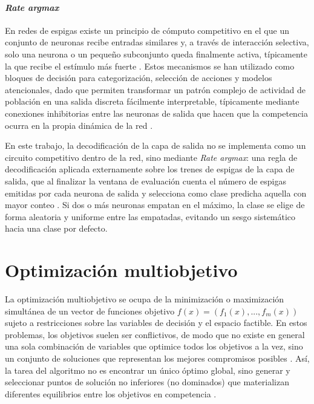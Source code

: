 \paragraph{\textit{Rate argmax}}
En redes de espigas existe un principio de cómputo competitivo en el que un conjunto de neuronas recibe entradas similares y, a través de interacción selectiva, solo una neurona o un pequeño subconjunto queda finalmente activa, típicamente la que recibe el estímulo más fuerte \cite{Oster2009wtaspikes}. Estos mecanismos se han utilizado como bloques de decisión para categorización, selección de acciones y modelos atencionales, dado que permiten transformar un patrón complejo de actividad de población en una salida discreta fácilmente interpretable, típicamente mediante conexiones inhibitorias entre las neuronas de salida que hacen que la competencia ocurra en la propia dinámica de la red \cite{Guo2021neuronalcodingsnn}.

En este trabajo, la decodificación de la capa de salida no se implementa como un circuito competitivo dentro de la red, sino mediante \textit{Rate argmax}: una regla de decodificación aplicada externamente sobre los trenes de espigas de la capa de salida, que al finalizar la ventana de evaluación cuenta el número de espigas emitidas por cada neurona de salida y selecciona como clase predicha aquella con mayor conteo \cite{Guo2021neuronalcodingsnn}. Si dos o más neuronas empatan en el máximo, la clase se elige de forma aleatoria y uniforme entre las empatadas, evitando un sesgo sistemático hacia una clase por defecto.




\section{Optimización multiobjetivo}\label{sec:optimizacion-multi}
La optimización multiobjetivo se ocupa de la minimización o maximización simultánea de un vector de funciones objetivo $f(x)=(f_1(x),...,f_m(x))$ sujeto a restricciones sobre las variables de decisión y el espacio factible. En estos problemas, los objetivos suelen ser conflictivos, de modo que no existe en general una sola combinación de variables que optimice todos los objetivos a la vez, sino un conjunto de soluciones que representan los mejores compromisos posibles \cite{Narayan2019optimization}. Así, la tarea del algoritmo no es encontrar un único óptimo global, sino generar y seleccionar puntos de solución no inferiores (no dominados) que materializan diferentes equilibrios entre los objetivos en competencia \cite{Narayan2019optimization}.

